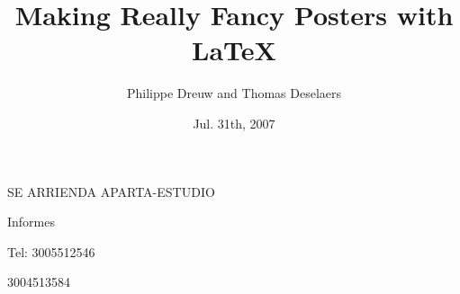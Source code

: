 \documentclass[final]{beamer}
\title[Fancy Posters]{Making Really Fancy Posters with \LaTeX}
\author[Dreuw \& Deselaers]{Philippe Dreuw and Thomas Deselaers}
\institute[RWTH Aachen University]{Human Language Technology and Pattern Recognition,RWTH Aachen University}
\date{Jul. 31th, 2007}
\begin{document}
  \begin{frame}{} 
      {\VeryHuge SE ARRIENDA APARTA-ESTUDIO}\par
      {\Large Informes}\par
      {\large Tel: 3005512546}\par
      {\large \hspace*{48pt} 3004513584}\par
  \end{frame}
\end{document}
